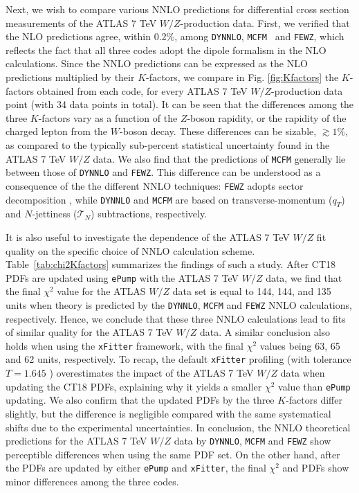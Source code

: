 Next, we wish to compare various NNLO predictions for differential cross section measurements of the ATLAS 7 TeV $W/Z$-production data.  
First, we verified that the NLO predictions agree, within 0.2\%, among  \texttt{DYNNLO},  \texttt{MCFM}~\cite{Boughezal:2016wmq,MCFM8} 
and \texttt{FEWZ}, which reflects the fact that all three codes adopt the dipole formalism \cite{Catani:1996jh,Catani:1996vz} in the NLO calculations. 
Since the NNLO predictions can be expressed as the NLO predictions multiplied by their $K$-factors, we compare in Fig. \ref{fig:Kfactors} the $K$-factors obtained from each code,
for every ATLAS 7 TeV $W/Z$-production data point (with 34 data points in total).
It can be seen that the differences among the three $K$-factors vary as a function of the $Z$-boson rapidity, or the rapidity of the charged lepton from the $W$-boson decay. 
These differences can be sizable, $\gtrsim\!1\%$, as compared to the typically sub-percent statistical uncertainty found in the ATLAS 7 TeV $W/Z$ data.  
We also find that the predictions of \texttt{MCFM} generally lie between those of \texttt{DYNNLO} and \texttt{FEWZ}. This difference can be understood as a consequence
of the the different NNLO techniques: \texttt{FEWZ} adopts sector decomposition \cite{Binoth:2000ps,Anastasiou:2003gr,Anastasiou:2005qj}, while \texttt{DYNNLO} and \texttt{MCFM}
are based on transverse-momentum ($q_T$) \cite{Catani:2007vq,Catani:2009sm} and $N$-jettiness ($\mathcal{T}_N$) \cite{Boughezal:2016wmq} subtractions, respectively. 

It is also useful to investigate the dependence of the ATLAS 7 TeV $W/Z$ fit quality on the specific choice of NNLO calculation scheme. 
Table~\ref{tab:chi2Kfactors} summarizes the findings of such a study. 
After CT18 PDFs are updated using \texttt{ePump} with the ATLAS 7 TeV $W/Z$ data, we find that the final $\chi^2$ value for the ATLAS $W/Z$ data set
is equal to 144, 144, and 135 units when theory is predicted by the \texttt{DYNNLO}, \texttt{MCFM} and \texttt{FEWZ} NNLO calculations, respectively. 
Hence, we conclude that these three NNLO calculations lead to fits of similar quality for the ATLAS 7 TeV $W/Z$ data.
A similar conclusion also holds when using the \texttt{xFitter} framework, with the final $\chi^2$ values being 63, 65 and 62 units, respectively.
To recap, the default \texttt{xFitter} profiling (with tolerance $T\! =\! 1.645$ ) overestimates the impact of the
ATLAS 7 TeV $W/Z$ data when updating the CT18 PDFs, explaining why it yields a smaller $\chi^2$ value than \texttt{ePump} updating. We also confirm that the updated PDFs by the three $K$-factors differ slightly, but the difference is negligible compared with the same systematical shifts due to the experimental uncertainties.  
In conclusion, the NNLO theoretical predictions for the ATLAS 7 TeV $W/Z$ data by \texttt{DYNNLO}, \texttt{MCFM} and \texttt{FEWZ}  show perceptible differences when using the same PDF set. On the other hand, after the PDFs are updated by either \texttt{ePump} and \texttt{xFitter}, the final $\chi^2$ and PDFs show minor differences among the three codes.
